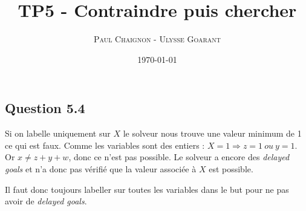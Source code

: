 \documentclass[a4paper,12pt]{article}
\title{TP5 - Contraindre puis chercher}
\author{\textsc{Paul Chaignon} - \textsc{Ulysse Goarant}}
\date{\today}
\begin{document}
\maketitle


\vspace{2cm}

\subsection*{Question 5.4}

Si on labelle uniquement sur $X$ le solveur nous trouve une valeur minimum de 1 ce qui est faux.
Comme les variables sont des entiers : $X = 1 \Rightarrow z = 1\ ou\ y = 1$.
Or $x \ne z + y + w$, donc ce n'est pas possible.
Le solveur a encore des \textit{delayed goals} et n'a donc pas vérifié que la valeur associée à $X$ est possible.

Il faut donc toujours labeller sur toutes les variables dans le but pour ne pas avoir de \textit{delayed goals}.
\end{document}
